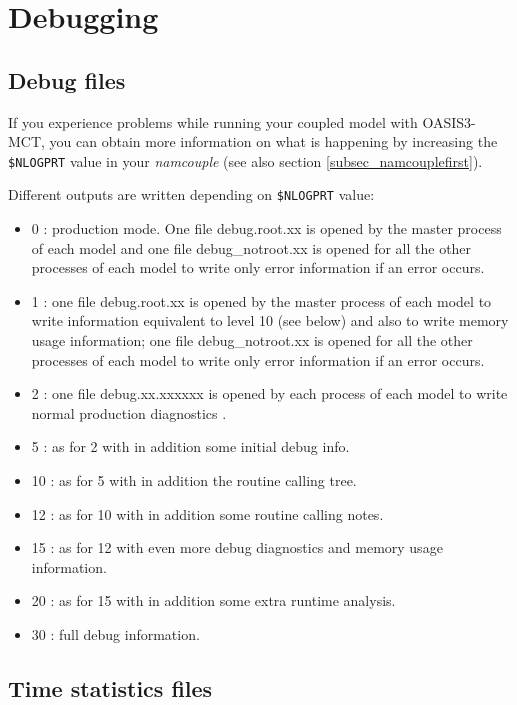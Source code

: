 \section{Debugging}
\label{subsec_debug}

\subsection{Debug files}
If you experience problems while running your coupled model with
OASIS3-MCT, you can obtain more information on what is happening by
increasing the {\tt \$NLOGPRT} value in your {\it namcouple} (see also section
\ref{subsec_namcouplefirst}).

Different outputs are written depending on {\tt \$NLOGPRT} value:
\begin{itemize}
\item {0} : production mode. One file debug.root.xx is opened by the master process of
  each model and one file debug\_notroot.xx is opened for all the other
  processes of each model to write only error information if an error
  occurs.
\item {1} : one file debug.root.xx is opened by the master process of
  each model to write information equivalent to level 10 (see below)
  and also to write memory usage information;
  one file debug\_notroot.xx is opened for all the other processes of
  each model to write only error information if an error occurs.
\item {2} : one file debug.xx.xxxxxx is opened by each process of each
  model to write normal production diagnostics .
\item {5} : as for 2 with in addition some initial debug info.
\item {10} : as for 5 with in addition the routine calling tree.
\item {12} : as for 10 with in addition some routine calling notes.
\item {15} : as for 12 with even more debug diagnostics and memory usage information.
\item {20} : as for 15 with in addition some extra runtime analysis.
\item {30} : full debug information.
\end{itemize}

\subsection{Time statistics files}
\label{timestat}


